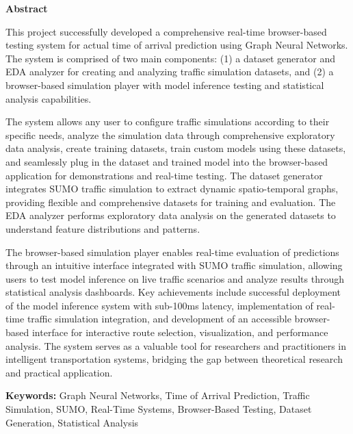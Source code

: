 \begin{center}
{\large\bfseries Abstract}
\end{center}

\vspace{1em}

This project successfully developed a comprehensive real-time browser-based testing system for actual time of arrival prediction using Graph Neural Networks. The system is comprised of two main components: (1) a dataset generator and EDA analyzer for creating and analyzing traffic simulation datasets, and (2) a browser-based simulation player with model inference testing and statistical analysis capabilities.

The system allows any user to configure traffic simulations according to their specific needs, analyze the simulation data through comprehensive exploratory data analysis, create training datasets, train custom models using these datasets, and seamlessly plug in the dataset and trained model into the browser-based application for demonstrations and real-time testing. The dataset generator integrates SUMO traffic simulation to extract dynamic spatio-temporal graphs, providing flexible and comprehensive datasets for training and evaluation. The EDA analyzer performs exploratory data analysis on the generated datasets to understand feature distributions and patterns.

The browser-based simulation player enables real-time evaluation of predictions through an intuitive interface integrated with SUMO traffic simulation, allowing users to test model inference on live traffic scenarios and analyze results through statistical analysis dashboards. Key achievements include successful deployment of the model inference system with sub-100ms latency, implementation of real-time traffic simulation integration, and development of an accessible browser-based interface for interactive route selection, visualization, and performance analysis. The system serves as a valuable tool for researchers and practitioners in intelligent transportation systems, bridging the gap between theoretical research and practical application.

\vspace{1em}

\noindent\textbf{Keywords:} Graph Neural Networks, Time of Arrival Prediction, Traffic Simulation, SUMO, Real-Time Systems, Browser-Based Testing, Dataset Generation, Statistical Analysis

